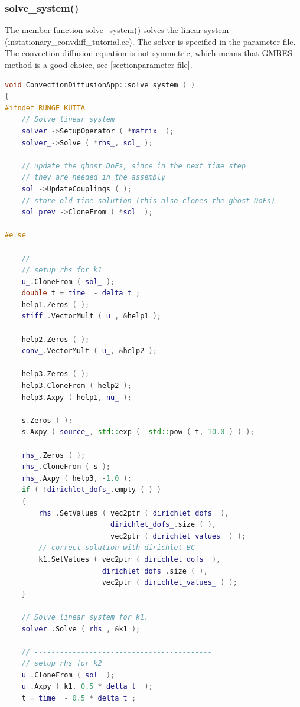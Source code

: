 \documentclass[a4paper, 11pt, twoside]{article}
\begin{document}
\subsubsection{solve\_system()}\label{sec:solve}
The member function solve\_system() solves  the linear system (instationary\_convdiff\_tutorial.cc). The solver is specified in the parameter file. The convection-diffusion equation is not symmetric, which means that GMRES-method is a good choice, see \ref{sectionparameter file}.
\begin{lstlisting}[language=C++, basicstyle={\footnotesize, \ttfamily}, keywordstyle=\color{blue}, numbers=none, tabsize=4]
void ConvectionDiffusionApp::solve_system ( )
{
#ifndef RUNGE_KUTTA
    // Solve linear system
    solver_->SetupOperator ( *matrix_ );
    solver_->Solve ( *rhs_, sol_ );

    // update the ghost DoFs, since in the next time step
    // they are needed in the assembly
    sol_->UpdateCouplings ( );
    // store old time solution (this also clones the ghost DoFs)
    sol_prev_->CloneFrom ( *sol_ );

#else

    // ------------------------------------------
    // setup rhs for k1
    u_.CloneFrom ( sol_ );
    double t = time_ - delta_t_;
    help1.Zeros ( );
    stiff_.VectorMult ( u_, &help1 );

    help2.Zeros ( );
    conv_.VectorMult ( u_, &help2 );

    help3.Zeros ( );
    help3.CloneFrom ( help2 );
    help3.Axpy ( help1, nu_ );

    s.Zeros ( );
    s.Axpy ( source_, std::exp ( -std::pow ( t, 10.0 ) ) );

    rhs_.Zeros ( );
    rhs_.CloneFrom ( s );
    rhs_.Axpy ( help3, -1.0 );
    if ( !dirichlet_dofs_.empty ( ) )
    {
        rhs_.SetValues ( vec2ptr ( dirichlet_dofs_ ), 
                         dirichlet_dofs_.size ( ), 
                         vec2ptr ( dirichlet_values_ ) );
        // correct solution with dirichlet BC
        k1.SetValues ( vec2ptr ( dirichlet_dofs_ ), 
                       dirichlet_dofs_.size ( ), 
                       vec2ptr ( dirichlet_values_ ) );
    }

    // Solve linear system for k1.
    solver_.Solve ( rhs_, &k1 );

    // ------------------------------------------
    // setup rhs for k2
    u_.CloneFrom ( sol_ );
    u_.Axpy ( k1, 0.5 * delta_t_ );
    t = time_ - 0.5 * delta_t_;


\end{lstlisting}
\end{document}
